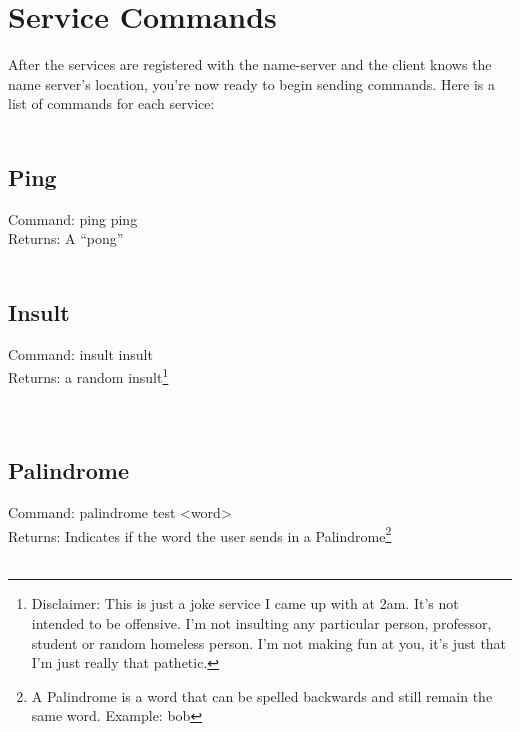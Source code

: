 \documentclass[a4paper,11pt]{article}
\begin{document}
\section{Service Commands}
After the services are registered with the name-server and the client knows the name server's location, you're now ready to begin sending commands. Here is a list of commands for each service:\\
\\
\subsection{Ping}
Command: ping ping\\
Returns: A ``pong''\\
\\
\subsection{Insult}
Command: insult insult\\
Returns: a random insult\footnote{Disclaimer: This is just a joke service I came up with at 2am. It's not intended to be offensive. I'm not insulting any particular person, professor, student or random homeless person. I'm not making fun at you, it's just that I'm just really that pathetic.}\\
 \\
\\
\subsection{Palindrome}
Command: palindrome test \textless word\textgreater\\
Returns: Indicates if the word the user sends in a Palindrome\footnote{A Palindrome is a word that can be spelled backwards and still remain the same word. Example: bob}\\
\\
\end{document}
